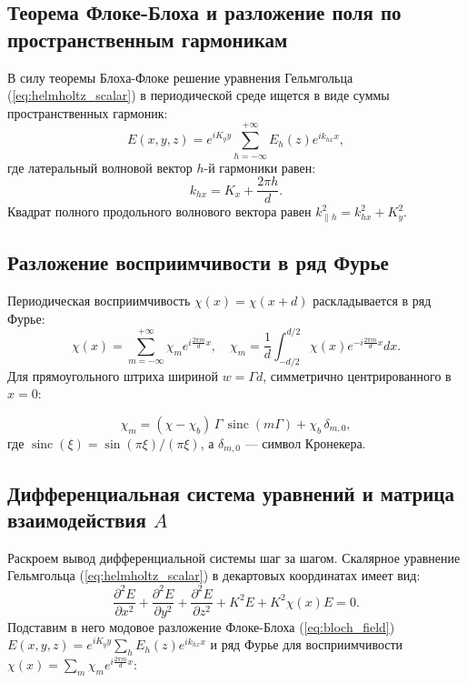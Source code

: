 \documentclass[a4paper,11pt]{article}
\begin{document}
\subsection{Теорема Флоке-Блоха и разложение поля по пространственным гармоникам}

В силу теоремы Блоха-Флоке решение уравнения Гельмгольца (\ref{eq:helmholtz_scalar}) в периодической среде ищется в виде суммы пространственных гармоник:
\begin{equation}
    E(x, y, z) = e^{i K_y y} \sum_{h = -\infty}^{+\infty} E_h(z) e^{i k_{hx} x},
    \label{eq:bloch_field}
\end{equation}
где латеральный волновой вектор $h$-й гармоники равен:
\begin{equation}
    k_{hx} = K_x + \frac{2\pi h}{d}.
    \label{eq:khx}
\end{equation}
Квадрат полного продольного волнового вектора равен $k_{\parallel h}^2 = k_{hx}^2 + K_y^2$.

\subsection{Разложение восприимчивости в ряд Фурье}

Периодическая восприимчивость $\chi(x) = \chi(x + d)$ раскладывается в ряд Фурье:
\begin{equation}
    \chi(x) = \sum_{m = -\infty}^{+\infty} \chi_m e^{i \frac{2\pi m}{d} x}, \quad \chi_m = \frac{1}{d} \int_{-d/2}^{d/2} \chi(x) e^{-i \frac{2\pi m}{d} x} dx.
\end{equation}
Для прямоугольного штриха шириной $w = \Gamma d$, симметрично центрированного в $x = 0$:
\begin{mathbox}
\begin{equation}
    \chi_m = (\chi - \chi_b) \, \Gamma \, \operatorname{sinc}(m \Gamma) + \chi_b \, \delta_{m, 0},
    \label{eq:fourier_chi_analytic}
\end{equation}
где $\operatorname{sinc}(\xi) = \sin(\pi \xi) / (\pi \xi)$, а $\delta_{m,0}$ — символ Кронекера.
\end{mathbox}

\subsection{Дифференциальная система уравнений и матрица взаимодействия \texorpdfstring{$A$}{A}}

Раскроем вывод дифференциальной системы шаг за шагом. Скалярное уравнение Гельмгольца (\ref{eq:helmholtz_scalar}) в декартовых координатах имеет вид:
\begin{equation}
    \frac{\partial^2 E}{\partial x^2} + \frac{\partial^2 E}{\partial y^2} + \frac{\partial^2 E}{\partial z^2} + K^2 E + K^2 \chi(x) E = 0.
    \label{eq:helmholtz_expanded}
\end{equation}
Подставим в него модовое разложение Флоке-Блоха (\ref{eq:bloch_field}) $E(x, y, z) = e^{i K_y y} \sum_h E_h(z) e^{i k_{hx} x}$ и ряд Фурье для восприимчивости $\chi(x) = \sum_m \chi_m e^{i \frac{2\pi m}{d} x}$:
\end{document}
